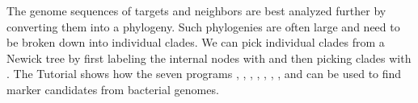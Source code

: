 The genome sequences of targets and neighbors are best analyzed
further by converting them into a phylogeny. Such phylogenies are
often large and need to be broken down into individual clades. We can
pick individual clades from a Newick tree by first labeling the
internal nodes with  and then picking clades
with . The Tutorial shows how the seven
programs , , , ,
, , , and  can be used
to find marker candidates from bacterial genomes.
